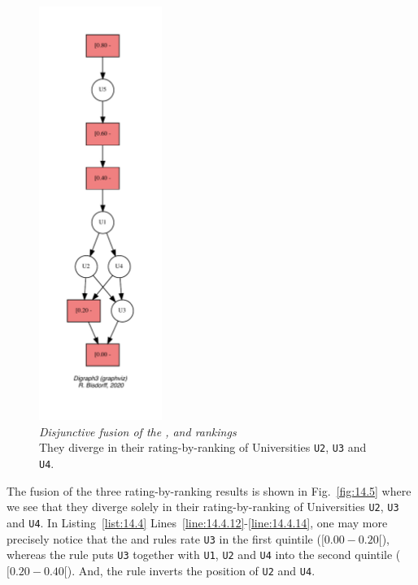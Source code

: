 \begin{figure}[ht]
\sidecaption[t]
\includegraphics[width=4cm]{Figures/14-5-fusionResult.pdf}
\caption[Disjunctive fusion of the \Kemeny, \Copeland and \NetFlows rankings]{\emph{Disjunctive fusion of the \Kemeny, \Copeland and \NetFlows rankings}\\ They diverge in their rating-by-ranking of Universities \texttt{U2}, \texttt{U3} and \texttt{U4}.}
\label{fig:14.5}       %
\end{figure}

The fusion of the three rating-by-ranking results is shown in Fig.~\vref{fig:14.5} where we see that they diverge solely in their rating-by-ranking of Universities \texttt{U2}, \texttt{U3} and \texttt{U4}. In Listing~\vref{list:14.4} Lines~\ref{line:14.4.12}-\ref{line:14.4.14}, one may more precisely notice that the \Kemeny and \Copeland rules rate \texttt{U3} in the first quintile ($[0.00- 0.20[$), whereas the \NetFlows rule puts \texttt{U3} together with \texttt{U1}, \texttt{U2} and \texttt{U4} into the second quintile ($[0.20- 0.40[$). And, the \Kemeny rule inverts the position of \texttt{U2} and \texttt{U4}.

